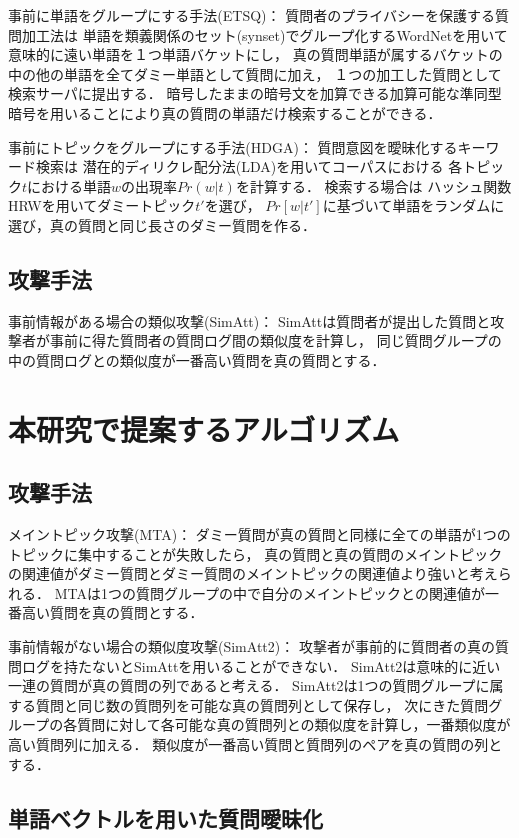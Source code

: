 \documentclass[papersize]{suribtabst}
\begin{document}
事前に単語をグループにする手法(ETSQ)\cite{embellishing2010}：
質問者のプライバシーを保護する質問加工法は
単語を類義関係のセット(synset)でグループ化するWordNet\cite{wordnet1995}を用いて意味的に遠い単語を１つ単語バケットにし，
真の質問単語が属するバケットの中の他の単語を全てダミー単語として質問に加え，
１つの加工した質問として検索サーパに提出する．
暗号したままの暗号文を加算できる加算可能な準同型暗号\cite{dpe1994}を用いることにより真の質問の単語だけ検索することができる．

事前にトピックをグループにする手法(HDGA)\cite{masking2014}：
質問意図を曖昧化するキーワード検索は
潜在的ディリクレ配分法(LDA)\cite{lda2003}を用いてコーパスにおける
各トピック$t$における単語$w$の出現率$Pr(w|t)$を計算する．
検索する場合は
ハッシュ関数HRW\cite{hrw1998}を用いてダミートピック$t'$を選び，
$Pr[w|t']$に基づいて単語をランダムに選び，真の質問と同じ長さのダミー質問を作る．

\subsection{攻撃手法}
事前情報がある場合の類似攻撃(SimAtt)\cite{simattack2016}：
SimAttは質問者が提出した質問と攻撃者が事前に得た質問者の質問ログ間の類似度を計算し，
同じ質問グループの中の質問ログとの類似度が一番高い質問を真の質問とする．

\section{本研究で提案するアルゴリズム}
\subsection{攻撃手法}
メイントピック攻撃(MTA)：
ダミー質問が真の質問と同様に全ての単語が1つのトピックに集中することが失敗したら，
真の質問と真の質問のメイントピックの関連値がダミー質問とダミー質問のメイントピックの関連値より強いと考えられる．
MTAは1つの質問グループの中で自分のメイントピックとの関連値が一番高い質問を真の質問とする．

事前情報がない場合の類似度攻撃(SimAtt2)：
攻撃者が事前的に質問者の真の質問ログを持たないとSimAttを用いることができない．
SimAtt2は意味的に近い一連の質問が真の質問の列であると考える．
SimAtt2は1つの質問グループに属する質問と同じ数の質問列を可能な真の質問列として保存し，
次にきた質問グループの各質問に対して各可能な真の質問列との類似度を計算し，一番類似度が高い質問列に加える．
類似度が一番高い質問と質問列のペアを真の質問の列とする．

\subsection{単語ベクトルを用いた質問曖昧化}
\end{document}
